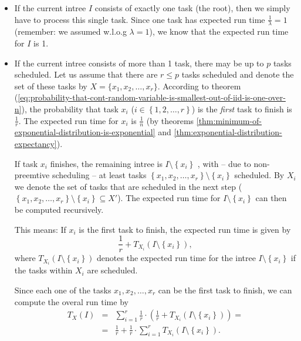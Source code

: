 \begin{itemize}
\item If the current intree $I$ consists of exactly one task (the root), then we simply have to process this single task. Since one task has expected run time $\frac{1}{\lambda}=1$ (remember: we assumed w.l.o.g $\lambda=1$), we know that the expected run time for $I$ is 1.
\item If the current intree consists of more than 1 task, there may be up to $p$ tasks scheduled. Let us assume that there are $r\leq p$ tasks scheduled and denote the set of these tasks by $X=\{x_1,x_2,\dots,x_r\}$. According to theorem (\ref{eq:probability-that-cont-random-variable-is-smallest-out-of-iid-is-one-over-n}), the probability that task $x_i$ ($i\in\left\{ 1,2,\dots,r \right\}$) is the \emph{first} task to finish is $\frac{1}{r}$. The expected run time for $x_i$ is $\frac{1}{n}$ (by theorems \ref{thm:minimum-of-exponential-distribution-is-exponential} and \ref{thm:exponential-distribution-expectancy}).

  If task $x_i$ finishes, the remaining intree is $I\setminus\left\{ x_i \right\}$ , with -- due to non-preemtive scheduling -- at least tasks $\left\{ x_1,x_2,\dots,x_r \right\} \setminus \left\{ x_i \right\}$ scheduled. By $X_i$ we denote the set of tasks that are scheduled in the next step ($\left\{ x_1,x_2,\dots,x_r \right\} \setminus \left\{ x_i \right\} \subseteq X'$). The expected run time for $I\setminus\left\{ x_i \right\}$ can then be computed recursively.

  This means: If $x_i$ is the first task to finish, the expected run time is given by
  \begin{equation*}
    \frac{1}{r} + T_{X_i}(I\setminus\left\{ x_i \right\}),
  \end{equation*}
  where $T_{X_i}(I\setminus\left\{ x_i \right\})$ denotes the expected run time for the intree $I\setminus\left\{ x_i \right\}$ if the tasks within $X_i$ are scheduled.

  Since each one of the tasks $x_1,x_2,\dots,x_r$ can be the first task to finish, we can compute the overal run time by 
  \begin{eqnarray}
    \nonumber
    T_X(I) 
    &=& 
    \sum_{i=1}^r \frac{1}{r} \cdot \left( \frac{1}{r} + T_{X_i}\left( I\setminus\left\{ x_i \right\} \right) \right) = \\
    \label{eqn:intro-recursive-formula-for-run-time}
    &=&     
    \frac{1}{r} + \frac{1}{r} \cdot \sum_{i=1}^r T_{X_i}\left( I\setminus\left\{ x_i \right\} \right).
  \end{eqnarray}
\end{itemize}

